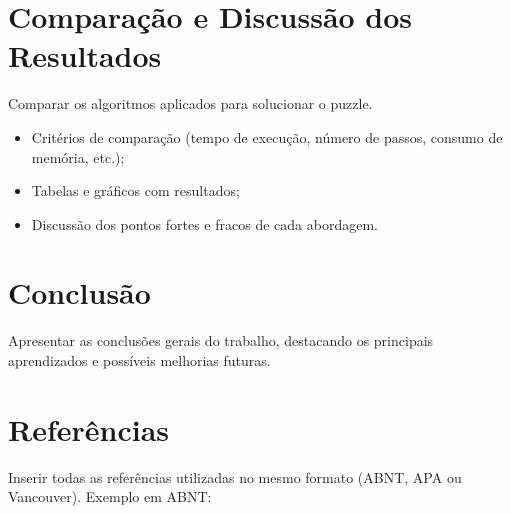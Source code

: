 \documentclass[12pt,a4paper]{article}
\begin{document}
\section{Comparação e Discussão dos Resultados}
Comparar os algoritmos aplicados para solucionar o puzzle.
\begin{itemize}
\item Critérios de comparação (tempo de execução, número de passos, consumo de memória, etc.);
\item Tabelas e gráficos com resultados;
\item Discussão dos pontos fortes e fracos de cada abordagem.
\end{itemize}

\section{Conclusão}
Apresentar as conclusões gerais do trabalho, destacando os principais aprendizados e possíveis melhorias futuras.

\section*{Referências}

Inserir todas as referências utilizadas no mesmo formato (ABNT, APA ou Vancouver).  
Exemplo em ABNT:

\end{document}

